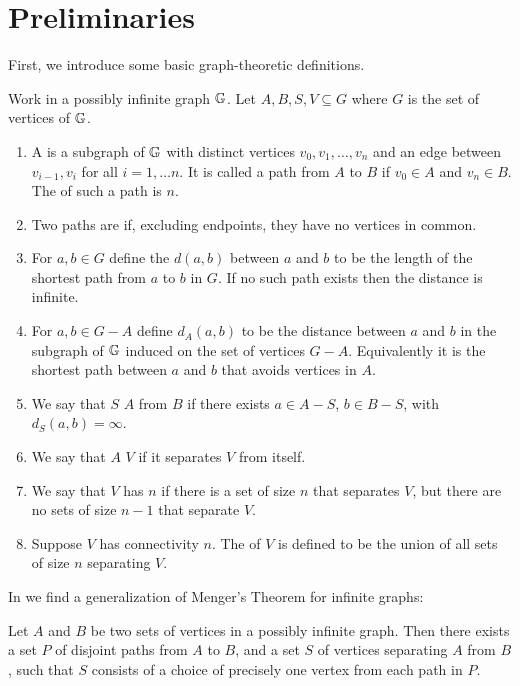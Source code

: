\section{Preliminaries}
First, we introduce some basic graph-theoretic definitions.
\begin{Definition}
  Work in a possibly infinite graph $\mathbb G$. Let $A, B, S, V \subseteq G$ where $G$ is the set of vertices of $\mathbb G$.
  \begin{enumerate}
  \item A  is a subgraph of $\mathbb G$ with distinct vertices $v_0, v_1, \ldots, v_n$ and an edge between $v_{i-1}, v_i$ for all $i = 1, \ldots n$.
    It is called a path from $A$ to $B$ if $v_0 \in A$ and $v_n \in B$.
    The  of such a path is $n$.
  \item Two paths are  if, excluding endpoints, they have no vertices in common.
  \item For $a,b \in G$ define the  $d(a,b)$ between $a$ and $b$ to be the length of the shortest path from $a$ to $b$ in $G$.
    If no such path exists then the distance is infinite.
  \item For $a,b \in G - A$ define $d_A(a,b)$ to be the distance between $a$ and $b$ in the subgraph of $\mathbb G$
    induced on the set of vertices $G - A$. Equivalently it is the shortest path between $a$ and $b$ that avoids vertices in $A$.
  \item We say that $S$  $A$ from $B$ if there exists $a \in A - S$, $b \in B - S$, with $d_S(a,b) = \infty$.
  \item We say that $A$  $V$ if it separates $V$ from itself.
  \item We say that $V$ has  $n$ if there is a set of size $n$ that separates $V$,
    but there are no sets of size $n-1$ that separate $V$.
  \item Suppose $V$ has connectivity $n$. The  of $V$ is defined to be the union of all sets of size $n$ separating $V$.
  \end{enumerate}
\end{Definition}

In \cite{infinite_megner} we find a generalization of Menger's Theorem for infinite graphs:

\begin{Theorem} \label{megner}
  Let $A$ and $B$ be two sets of vertices in a possibly infinite graph. Then there exists a set $P$ of disjoint paths from $A$ to $B$, and a set $S$ of vertices separating $A$ from $B$, such that $S$ consists of a choice of precisely one vertex from each path in $P$.
\end{Theorem}

